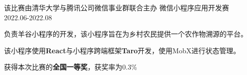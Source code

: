
\begin{cventries}

    \cventry
    {该比赛由清华大学与腾讯公司微信事业群联合主办} %
    {微信小程序应用开发赛} %
    {} %
    {2022.06-2022.08} %
    {
        \begin{cvitems} %
            \item {负责羊谷小程序的开发，该小程序旨在为乡村农民提供一个农作物溯源的平台。}
            \item {该小程序使用\textbf{React}与小程序跨端框架\textbf{Taro}开发，使用MobX进行状态管理。}
            \item {获得本次比赛的\textbf{全国一等奖}，获奖率为0.3\%}
        \end{cvitems}
    }

\end{cventries}
